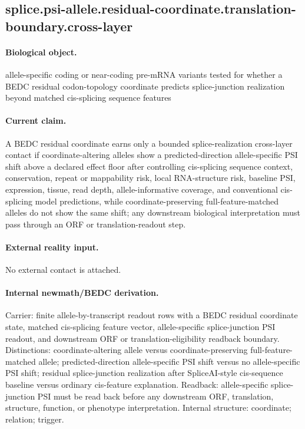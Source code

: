 \subsection{splice.psi-allele.residual-coordinate.translation-boundary.cross-layer}

\paragraph{Biological object.} allele-specific coding or near-coding pre-mRNA variants tested for whether a BEDC residual codon-topology coordinate predicts splice-junction realization beyond matched cis-splicing sequence features

\paragraph{Current claim.} A BEDC residual coordinate earns only a bounded splice-realization cross-layer contact if coordinate-altering alleles show a predicted-direction allele-specific PSI shift above a declared effect floor after controlling cis-splicing sequence context, conservation, repeat or mappability risk, local RNA-structure risk, baseline PSI, expression, tissue, read depth, allele-informative coverage, and conventional cis-splicing model predictions, while coordinate-preserving full-feature-matched alleles do not show the same shift; any downstream biological interpretation must pass through an ORF or translation-readout step.

\paragraph{External reality input.}
No external contact is attached.

\paragraph{Internal newmath/BEDC derivation.} Carrier: finite allele-by-transcript readout rows with a BEDC residual coordinate state, matched cis-splicing feature vector, allele-specific splice-junction PSI readout, and downstream ORF or translation-eligibility readback boundary. Distinctions: coordinate-altering allele versus coordinate-preserving full-feature-matched allele; predicted-direction allele-specific PSI shift versus no allele-specific PSI shift; residual splice-junction realization after SpliceAI-style cis-sequence baseline versus ordinary cis-feature explanation. Readback: allele-specific splice-junction PSI must be read back before any downstream ORF, translation, structure, function, or phenotype interpretation. Internal structure: coordinate; relation; trigger.

